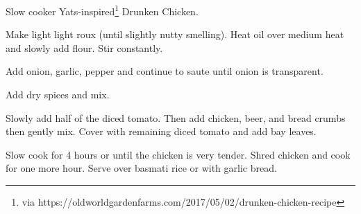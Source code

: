 
Slow cooker Yats-inspired\footnote{via https://oldworldgardenfarms.com/2017/05/02/drunken-chicken-recipe} Drunken Chicken.


Make light light roux (until slightly nutty smelling). Heat oil over medium heat and slowly add flour. Stir constantly.

\begin{ingredients}
\end{ingredients}

Add onion, garlic, pepper and continue to saute until onion is transparent.

\begin{ingredients}
\end{ingredients}

Add dry spices and mix.

\begin{ingredients}
\end{ingredients}

Slowly add half of the diced tomato. Then add chicken, beer, and bread crumbs then gently mix. Cover with remaining diced tomato and add bay leaves.

\begin{ingredients}
\end{ingredients}

Slow cook for 4 hours or until the chicken is very tender. Shred chicken and cook for one more hour. Serve over basmati rice or with garlic bread.
